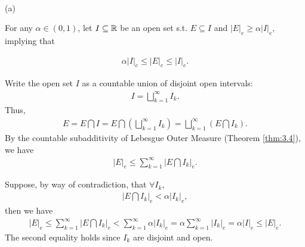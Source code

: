 \documentclass[UTF8,a4paper,10pt]{article}
\begin{document}
  \begin{solution}\,

    (a)

    For any \(\alpha\in(0,1)\), let \(I\subseteq \operatorname{\mathbb{R}}\) be an open set s.t. \(E\subseteq I\) and \(|E|_e \geq \alpha|I|_e\), implying that 
  
    \begin{equation*}
      \begin{aligned}
        \alpha |I|_e\leq |E|_e\leq |I|_e.
      \end{aligned}
    \end{equation*}

    Write the open set \(I\) as a countable union of disjoint open intervals:
    \begin{equation*}
      \begin{aligned}
        I = \bigsqcup_{k = 1}^{\infty}I_k.
      \end{aligned}
    \end{equation*}
    Thus, 
    \begin{equation*}
      \begin{aligned}
        E = E\bigcap I = E \bigcap\left(\bigsqcup_{k = 1}^{\infty}I_k\right) = \bigsqcup_{k = 1}^{\infty} \left(E\bigcap I_k\right).
      \end{aligned}
    \end{equation*}
    By the countable subadditivity of Lebesgue Outer Measure (Theorem \ref*{thm:3.4}), we have 
    \begin{equation*}
      \begin{aligned}
        |E|_e\leq \sum_{k = 1}^{\infty} \left|E\bigcap I_k\right|_e.
      \end{aligned}
    \end{equation*}

    Suppose, by way of contradiction, that \(\forall I_k\), 
    \begin{equation*}
      \begin{aligned}
         \left|E\bigcap I_k\right|_e <\alpha |I_k|_e,
      \end{aligned}
    \end{equation*}
    then we have
    \begin{equation*}
      \begin{aligned}
        |E|_e\leq \sum_{k = 1}^{\infty}\left|E\bigcap I_k\right|_e < \sum_{k = 1}^{\infty}\alpha |I_k|_e = \alpha \sum_{k = 1}^{\infty} |I_k|_e = \alpha |I|_e \leq |E|_e.
      \end{aligned}
    \end{equation*}
    The second equality holds since \(I_k\) are disjoint and open.


\end{solution}
\end{document}
